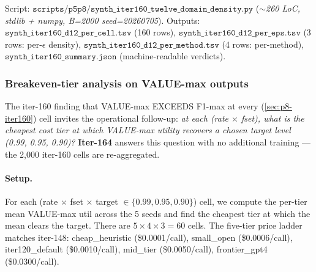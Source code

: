 \documentclass{article}
\begin{document}
Script: $\texttt{scripts/p5p8/synth\_iter160\_twelve\_domain\_density.py}$
(\textit{$\sim$260 LoC, stdlib + numpy, B=2000 seed=20260705}).
Outputs:
$\texttt{synth\_iter160\_d12\_per\_cell.tsv}$ (160 rows),
$\texttt{synth\_iter160\_d12\_per\_eps.tsv}$ (3 rows: per-$\epsilon$
density),
$\texttt{synth\_iter160\_d12\_per\_method.tsv}$ (4 rows: per-method),
$\texttt{synth\_iter160\_summary.json}$ (machine-readable verdicts).
 

\subsubsection{Breakeven-tier analysis on VALUE-max outputs}
\label{sec:p8-iter164-breakeven}

The iter-160 finding that VALUE-max EXCEEDS F1-max at every
(\ref{sec:p8-iter160}) cell invites the operational follow-up: \emph{at
each (rate $\times$ fset), what is the cheapest cost tier at which
VALUE-max utility recovers a chosen target level (0.99, 0.95, 0.90)?}
\textbf{Iter-164} answers this question with no additional training — the
2{,}000 iter-160 cells are re-aggregated.

\paragraph{Setup.}
For each (rate $\times$ fset $\times$ target $\in \{0.99, 0.95, 0.90\}$) cell,
we compute the per-tier mean VALUE-max util across the 5 seeds and find
the cheapest tier at which the mean clears the target. There are
$5 \times 4 \times 3 = 60$ cells. The five-tier price ladder matches
iter-148: cheap\_heuristic (\$0.0001/call), small\_open (\$0.0006/call),
iter120\_default (\$0.0010/call), mid\_tier (\$0.0050/call),
frontier\_gpt4 (\$0.0300/call).
\end{document}

